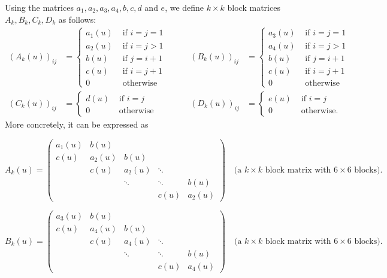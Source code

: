 \documentclass[11pt]{amsart}
\theoremstyle{definition}
\theoremstyle{remark}
\numberwithin{equation}{section}
\begin{document}
Using the matrices $a_1,a_2,a_3,a_4,b,c,d$ and $e$, we define $k\times k$ block matrices $A_k,B_k,C_k,D_k$ as follows:
\begin{equation*}
\begin{split}
(A_k(u))_{ij}&=\begin{cases}a_1(u)&\text{ if }i=j=1\\
a_2(u)&\text{ if }i=j>1\\
b(u)&\text{ if }j=i+1\\
c(u)&\text{ if }i=j+1\\
0&\text{ otherwise}
\end{cases}\\
(C_k(u))_{ij}&=\begin{cases}d(u)&\text{ if }i=j\\
0&\text{ otherwise}
\end{cases}
\end{split}
\quad\quad
\begin{split}
(B_k(u))_{ij}&=\begin{cases}a_3(u)&\text{ if }i=j=1\\
a_4(u)&\text{ if }i=j>1\\
b(u)&\text{ if }j=i+1\\
c(u)&\text{ if }i=j+1\\
0&\text{ otherwise}
\end{cases}\\
(D_k(u))_{ij}&=\begin{cases}e(u)&\text{ if }i=j\\
0&\text{ otherwise}.
\end{cases}
\end{split}
\end{equation*}
More concretely, it can be expressed as

\[
A_k(u)=
\begin{pmatrix}
a_1(u) & b(u)   &        &        &  \\
c(u)   & a_2(u) & b(u)   &        &  \\
       & c(u)   & a_2(u) & \ddots &  \\
       &        & \ddots & \ddots & b(u) \\
       &        &        & c(u)   & a_2(u)
\end{pmatrix}
\quad\text{(a $k\times k$ block matrix with $6\times 6$ blocks).}
\]

\[
B_k(u)=
\begin{pmatrix}
a_3(u) & b(u)   &        &        &  \\
c(u)   & a_4(u) & b(u)   &        &  \\
       & c(u)   & a_4(u) & \ddots &  \\
       &        & \ddots & \ddots & b(u) \\
       &        &        & c(u)   & a_4(u)
\end{pmatrix}
\quad\text{(a $k\times k$ block matrix with $6\times 6$ blocks).}
\]
\end{document}
